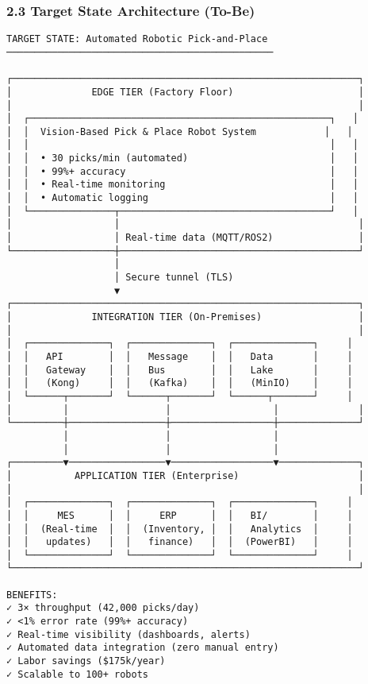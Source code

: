 \documentclass[
]{article}
\begin{document}
\hypertarget{target-state-architecture-to-be}{%
\subsubsection{2.3 Target State Architecture
(To-Be)}\label{target-state-architecture-to-be}}

\begin{verbatim}
TARGET STATE: Automated Robotic Pick-and-Place
───────────────────────────────────────────────

┌─────────────────────────────────────────────────────────────┐
│              EDGE TIER (Factory Floor)                      │
│                                                             │
│  ┌─────────────────────────────────────────────────────┐   │
│  │  Vision-Based Pick & Place Robot System            │   │
│  │                                                     │   │
│  │  • 30 picks/min (automated)                         │   │
│  │  • 99%+ accuracy                                    │   │
│  │  • Real-time monitoring                             │   │
│  │  • Automatic logging                                │   │
│  └───────────────┬─────────────────────────────────────┘   │
│                  │                                          │
│                  │ Real-time data (MQTT/ROS2)               │
└──────────────────┼──────────────────────────────────────────┘
                   │
                   │ Secure tunnel (TLS)
                   ▼
┌─────────────────────────────────────────────────────────────┐
│              INTEGRATION TIER (On-Premises)                 │
│                                                             │
│  ┌──────────────┐  ┌──────────────┐  ┌──────────────┐     │
│  │   API        │  │   Message    │  │   Data       │     │
│  │   Gateway    │  │   Bus        │  │   Lake       │     │
│  │   (Kong)     │  │   (Kafka)    │  │   (MinIO)    │     │
│  └──────┬───────┘  └──────┬───────┘  └──────┬───────┘     │
│         │                 │                  │              │
└─────────┼─────────────────┼──────────────────┼──────────────┘
          │                 │                  │
          │                 │                  │
┌─────────▼─────────────────▼──────────────────▼──────────────┐
│           APPLICATION TIER (Enterprise)                     │
│                                                             │
│  ┌──────────────┐  ┌──────────────┐  ┌──────────────┐     │
│  │     MES      │  │     ERP      │  │   BI/        │     │
│  │  (Real-time  │  │  (Inventory, │  │   Analytics  │     │
│  │   updates)   │  │   finance)   │  │  (PowerBI)   │     │
│  └──────────────┘  └──────────────┘  └──────────────┘     │
└─────────────────────────────────────────────────────────────┘

BENEFITS:
✓ 3× throughput (42,000 picks/day)
✓ <1% error rate (99%+ accuracy)
✓ Real-time visibility (dashboards, alerts)
✓ Automated data integration (zero manual entry)
✓ Labor savings ($175k/year)
✓ Scalable to 100+ robots
\end{verbatim}
\end{document}
